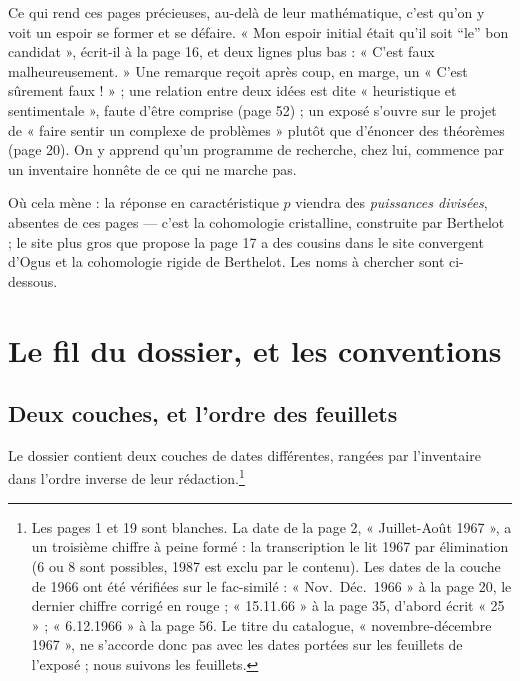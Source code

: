 \documentclass[11pt,a4paper]{article}
\begin{document}
\begin{resume}
Ce qui rend ces pages précieuses, au-delà de leur mathématique, c'est qu'on y
voit un espoir se former et se défaire. « Mon espoir initial était qu'il soit
“le” bon candidat », écrit-il à la page 16, et deux lignes plus bas : « C'est
faux malheureusement. » Une remarque reçoit après coup, en marge, un « C'est
sûrement faux ! » ; une relation entre deux idées est dite « heuristique et
sentimentale », faute d'être comprise (page 52) ; un exposé s'ouvre sur le
projet de « faire sentir un complexe de problèmes » plutôt que d'énoncer des
théorèmes (page 20). On y apprend qu'un programme de recherche, chez lui,
commence par un inventaire honnête de ce qui ne marche pas.

Où cela mène : la réponse en caractéristique $p$ viendra des \emph{puissances
divisées}, absentes de ces pages — c'est la cohomologie cristalline, construite
par Berthelot ; le site plus gros que propose la page 17 a des cousins dans le
site convergent d'Ogus et la cohomologie rigide de Berthelot. Les noms à
chercher sont ci-dessous.

\end{resume}

\section*{Le fil du dossier, et les conventions}

\subsection*{Deux couches, et l'ordre des feuillets}

Le dossier contient deux couches de dates différentes, rangées par
l'inventaire dans l'ordre inverse de leur rédaction.\footnote{Les pages 1 et
19 sont blanches. La date de la page 2, « Juillet-Août 1967 », a un troisième
chiffre à peine formé : la transcription le lit 1967 par élimination (6 ou 8
sont possibles, 1987 est exclu par le contenu). Les dates de la couche de
1966 ont été vérifiées sur le fac-similé : « Nov.\ Déc.\ 1966 » à la page 20,
le dernier chiffre corrigé en rouge ; « 15.11.66 » à la page 35, d'abord écrit
« 25 » ; « 6.12.1966 » à la page 56. Le titre du catalogue, « novembre-décembre
1967 », ne s'accorde donc pas avec les dates portées sur les feuillets de
l'exposé ; nous suivons les feuillets.}
\end{document}
